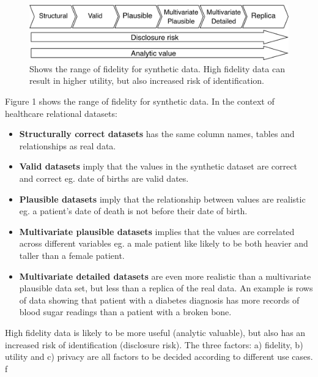 \documentclass[11pt]{article}
\begin{document}
\begin{figure}[ht]
\centering
\includegraphics[width=0.8\linewidth]{figures/ONS.png}
\caption{Shows the range of fidelity for synthetic data. High fidelity data can result in higher utility, but also increased risk of identification.}
\label{fig:Range of fidelity for synthetic data}
\end{figure}

Figure 1 shows the range of fidelity for synthetic data. In the context of healthcare relational datasets: 

\begin{itemize}
    \item \textbf{Structurally correct datasets} has the same column names, tables and relationships as real data. 
    \item \textbf{Valid datasets} imply that the values in the synthetic dataset are correct and correct eg. date of births are valid dates. 
    \item \textbf{Plausible datasets} imply that the relationship between values are realistic eg. a patient's date of death is not before their date of birth.
    \item \textbf{Multivariate plausible datasets} implies that the values are correlated across different variables eg. a male patient like likely to be both heavier and taller than a female patient. 
    \item \textbf{Multivariate detailed datasets} are even more realistic than a multivariate plausible data set, but less than a replica of the real data. An example is rows of data showing that patient with a diabetes diagnosis has more records of blood sugar readings than a patient with a broken bone.
\end{itemize}

High fidelity data is likely to be more useful (analytic valuable), but also has an increased risk of identification (disclosure risk). The three factors: a) fidelity, b) utility and c) privacy are all factors to be decided according to different use cases. f
\end{document}
